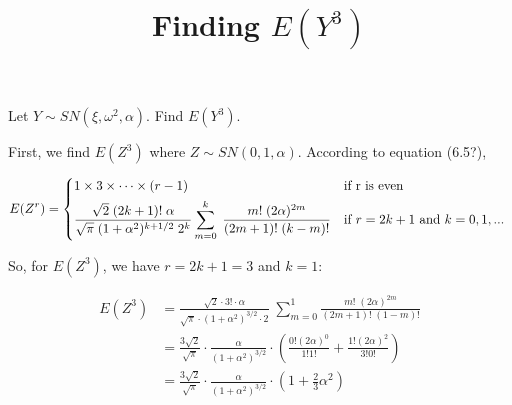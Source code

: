 \documentclass{article}
\begin{document}
\title {Finding $E(Y^3)$}
\date{}
\maketitle

Let $Y \sim SN(\xi, \omega^2, \alpha)$. Find $E(Y^3)$.

First, we find $E(Z^3)$ where $Z \sim SN(0, 1, \alpha)$. According to equation (6.5?),

\[
E(Z^r) =
 \begin{dcases*}
   1 \times 3 \times \cdots \times (r -1) & if r is even \\
   \frac{\sqrt{2}\;(2k + 1)!\;\alpha}{\sqrt{\pi}\;(1 + \alpha^2)^{k + 1/2}\;2^k}
   \sum_{m=0}^k\;\frac{m!\;(2\alpha)^{2m}}{(2m+1)!\;(k-m)!} & if $r = 2k+1$ and $k = 0, 1, ...$
\end{dcases*}
\]

So, for $E(Z^3)$, we have $r = 2k + 1 = 3$ and $k = 1$:

\begin{align*}
  E(Z^3) &= \frac{\sqrt{2} \cdot 3! \cdot \alpha}{\sqrt{\pi} \cdot (1 + \alpha^2)^{3/2} \cdot 2} \;
  \sum_{m=0}^1 \frac{m!\;(2\alpha)^{2m}}{(2m + 1)!\;(1 - m)!} \\
  &= \frac{3\sqrt{2}}{\sqrt{\pi}} \cdot \frac{\alpha}{(1 + \alpha^2)^{3/2}} \cdot \left( \frac{0!
      (2\alpha)^0}{1!1!} + \frac{1! (2\alpha)^2}{3!0!} \right) \\
  &= \frac{3\sqrt{2}}{\sqrt{\pi}} \cdot \frac{\alpha}{(1 + \alpha^2)^{3/2}} \cdot \left( 1 +
    \frac{2}{3}\alpha^2 \right)
\end{align*}
\end{document}
